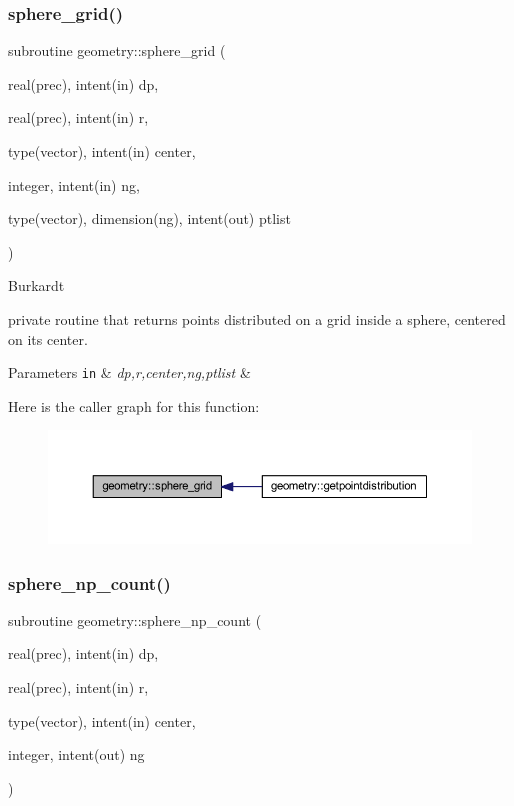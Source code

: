\subsubsection{\texorpdfstring{sphere\+\_\+grid()}{sphere\_grid()}}
{\footnotesize\ttfamily subroutine geometry\+::sphere\+\_\+grid (\begin{DoxyParamCaption}\item[{real(prec), intent(in)}]{dp,  }\item[{real(prec), intent(in)}]{r,  }\item[{type(vector), intent(in)}]{center,  }\item[{integer, intent(in)}]{ng,  }\item[{type(vector), dimension(ng), intent(out)}]{ptlist }\end{DoxyParamCaption})\hspace{0.3cm}{\ttfamily [private]}}



Burkardt 

private routine that returns points distributed on a grid inside a sphere, centered on its center. 
\begin{DoxyParams}[1]{Parameters}
\mbox{\tt in}  & {\em dp,r,center,ng,ptlist} & \\
\hline
\end{DoxyParams}
Here is the caller graph for this function\+:
\nopagebreak
\begin{figure}[H]
\begin{center}
\leavevmode
\includegraphics[width=350pt]{namespacegeometry_ae1ab88f5bfa764765180e1ba417e4bdf_icgraph}
\end{center}
\end{figure}
\mbox{\label{namespacegeometry_afb10fc3d303c98de110234acf3615274}} 
\subsubsection{\texorpdfstring{sphere\+\_\+np\+\_\+count()}{sphere\_np\_count()}}
{\footnotesize\ttfamily subroutine geometry\+::sphere\+\_\+np\+\_\+count (\begin{DoxyParamCaption}\item[{real(prec), intent(in)}]{dp,  }\item[{real(prec), intent(in)}]{r,  }\item[{type(vector), intent(in)}]{center,  }\item[{integer, intent(out)}]{ng }\end{DoxyParamCaption})\hspace{0.3cm}{\ttfamily [private]}}



